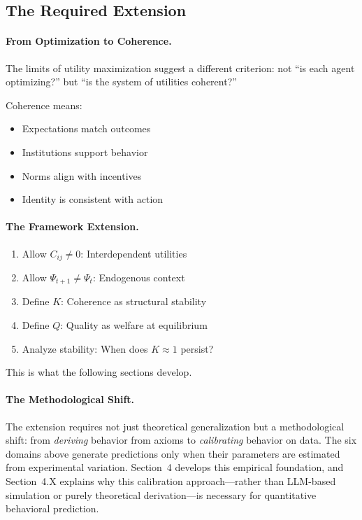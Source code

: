 \subsection{The Required Extension}

\paragraph{From Optimization to Coherence.}
The limits of utility maximization suggest a different criterion:
not ``is each agent optimizing?'' but ``is the system of utilities coherent?''

Coherence means:
\begin{itemize}
  \item Expectations match outcomes
  \item Institutions support behavior
  \item Norms align with incentives
  \item Identity is consistent with action
\end{itemize}

\paragraph{The Framework Extension.}
\begin{enumerate}
  \item Allow $C_{ij} \neq 0$: Interdependent utilities
  \item Allow $\Psi_{t+1} \neq \Psi_t$: Endogenous context
  \item Define $K$: Coherence as structural stability
  \item Define $Q$: Quality as welfare at equilibrium
  \item Analyze stability: When does $K \approx 1$ persist?
\end{enumerate}

This is what the following sections develop.

\paragraph{The Methodological Shift.}
The extension requires not just theoretical generalization but a methodological shift:
from \emph{deriving} behavior from axioms to \emph{calibrating} behavior on data.
The six domains above generate predictions only when their parameters are estimated
from experimental variation. Section~4 develops this empirical foundation, and
Section~4.X explains why this calibration approach---rather than LLM-based simulation
or purely theoretical derivation---is necessary for quantitative behavioral prediction.

